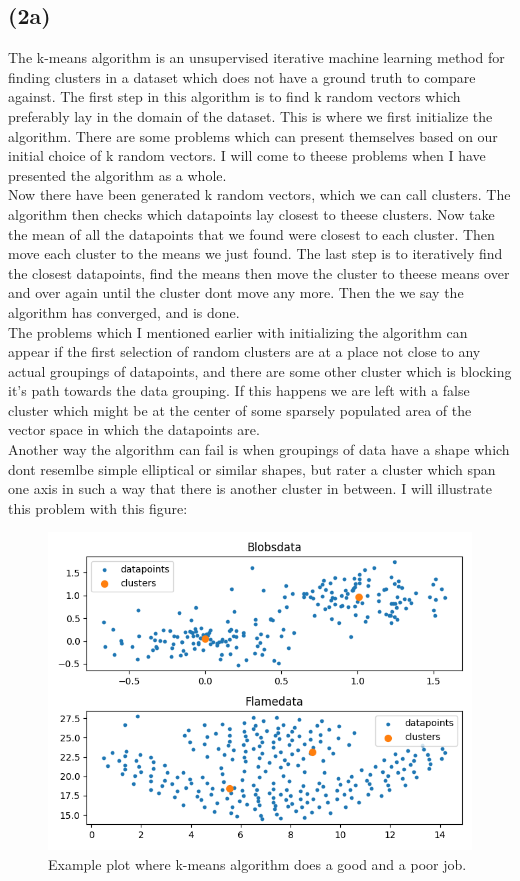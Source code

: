 \documentclass[12pt, letterpaper]{article}
\begin{document}
    \subsection*{(2a)}
      The k-means algorithm is an unsupervised iterative machine learning method for finding clusters in a dataset which does not have a ground truth to compare against. The first step in this algorithm is to find k random vectors which preferably lay in the domain of the dataset. This is where we first initialize the algorithm. There are some problems which can present themselves based on our initial choice of k random vectors. I will come to theese problems when I have presented the algorithm as a whole.\\
      Now there have been generated k random vectors, which we can call clusters. The algorithm then checks which datapoints lay closest to theese clusters. Now take the mean of all the datapoints that we found were closest to each cluster. Then move each cluster to the means we just found. The last step is to iteratively find the closest datapoints, find the means then move the cluster to theese means over and over again until the cluster dont move any more. Then the we say the algorithm has converged, and is done.\\
      The problems which I mentioned earlier with initializing the algorithm can appear if the first selection of random clusters are at a place not close to any actual groupings of datapoints, and there are some other cluster which is blocking it's path towards the data grouping. If this happens we are left with a false cluster which might be at the center of some sparsely populated area of the vector space in which the datapoints are.\\
      Another way the algorithm can fail is when groupings of data have a shape which dont resemlbe simple elliptical or similar shapes, but rater a cluster which span one axis in such a way that there is another cluster in between. I will illustrate this problem with this figure:\\
      \begin{figure}[H]
        \caption{Example plot where k-means algorithm does a good and a poor job.}
        \centering
        \includegraphics[scale=0.69]{exampleplot}
      \end{figure}
\end{document}
